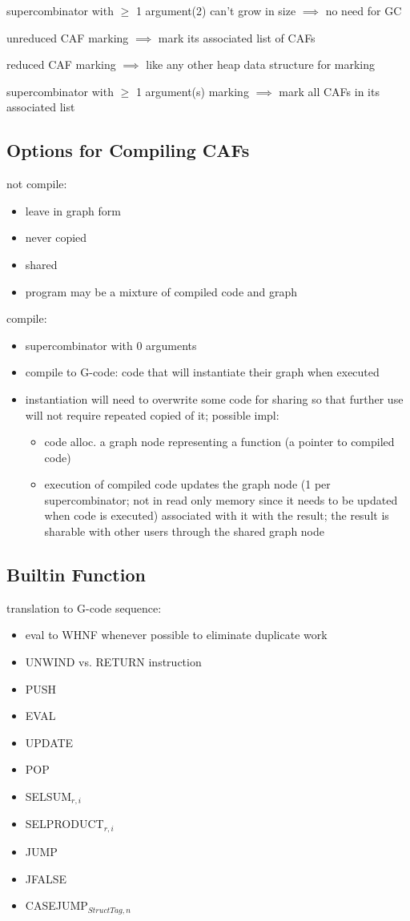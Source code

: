 \documentclass[8pt]{extarticle}
\begin{document}
\begin{multicols*}{2}
supercombinator with $\geq$ 1 argument(2) can't grow in size $\implies$ no need for GC

unreduced CAF marking $\implies$ mark its associated list of CAFs

reduced CAF marking $\implies$ like any other heap data structure for marking

supercombinator with $\geq$ 1 argument(s) marking $\implies$ mark all CAFs in its associated list

\subsection{Options for Compiling CAFs}
not compile:
\begin{itemize}
\item leave in graph form
\item never copied
\item shared
\item program may be a mixture of compiled code and graph
\end{itemize}

compile:
\begin{itemize}
\item supercombinator with 0 arguments
\item compile to G-code: code that will instantiate their graph when executed
\item instantiation will need to overwrite some code for sharing so that further use will not require repeated copied of it; possible impl:
  \begin{itemize}
  \item code alloc. a graph node representing a function (a pointer to compiled code)
  \item execution of compiled code updates the graph node (1 per supercombinator; not in read only memory since it needs to be updated when code is executed) associated with it with the result; the result is sharable with other users through the shared graph node
  \end{itemize}
\end{itemize}

\subsection{Builtin Function}

translation to G-code sequence:
\begin{itemize}
\item eval to WHNF whenever possible to eliminate duplicate work
\item UNWIND vs. RETURN instruction
\item PUSH
\item EVAL
\item UPDATE
\item POP
\item SELSUM$_{r,i}$
\item SELPRODUCT$_{r,i}$
\item JUMP
\item JFALSE
\item CASEJUMP$_{StructTag, n}$
\end{itemize}


\end{multicols*}
\end{document}
